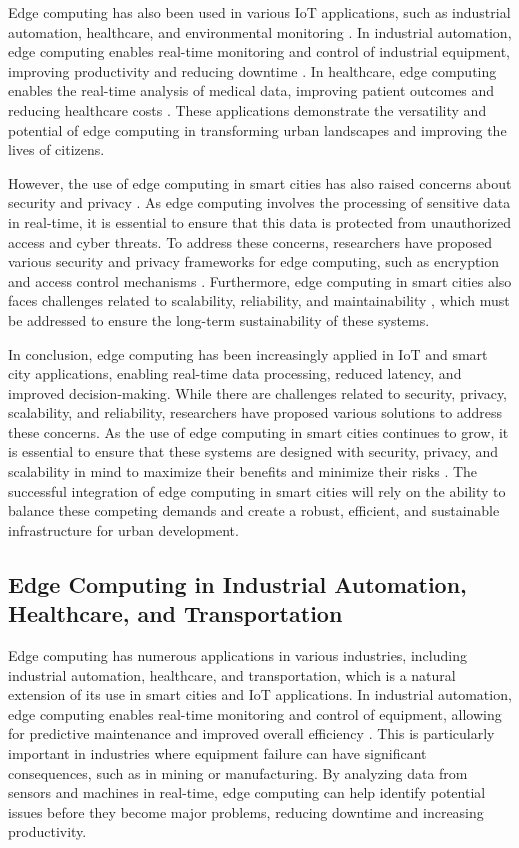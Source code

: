 \documentclass[11pt]{article}
\begin{document}
Edge computing has also been used in various IoT applications, such as industrial automation, healthcare, and environmental monitoring \cite{ref33}. In industrial automation, edge computing enables real-time monitoring and control of industrial equipment, improving productivity and reducing downtime \cite{ref34}. In healthcare, edge computing enables the real-time analysis of medical data, improving patient outcomes and reducing healthcare costs \cite{ref35}. These applications demonstrate the versatility and potential of edge computing in transforming urban landscapes and improving the lives of citizens.

However, the use of edge computing in smart cities has also raised concerns about security and privacy \cite{ref30}. As edge computing involves the processing of sensitive data in real-time, it is essential to ensure that this data is protected from unauthorized access and cyber threats. To address these concerns, researchers have proposed various security and privacy frameworks for edge computing, such as encryption and access control mechanisms \cite{ref36}. Furthermore, edge computing in smart cities also faces challenges related to scalability, reliability, and maintainability \cite{ref37}, which must be addressed to ensure the long-term sustainability of these systems.

In conclusion, edge computing has been increasingly applied in IoT and smart city applications, enabling real-time data processing, reduced latency, and improved decision-making. While there are challenges related to security, privacy, scalability, and reliability, researchers have proposed various solutions to address these concerns. As the use of edge computing in smart cities continues to grow, it is essential to ensure that these systems are designed with security, privacy, and scalability in mind to maximize their benefits and minimize their risks \cite{ref20}. The successful integration of edge computing in smart cities will rely on the ability to balance these competing demands and create a robust, efficient, and sustainable infrastructure for urban development.

\subsection{Edge Computing in Industrial Automation, Healthcare, and Transportation}

Edge computing has numerous applications in various industries, including industrial automation, healthcare, and transportation, which is a natural extension of its use in smart cities and IoT applications. In industrial automation, edge computing enables real-time monitoring and control of equipment, allowing for predictive maintenance and improved overall efficiency \cite{ref38}. This is particularly important in industries where equipment failure can have significant consequences, such as in mining or manufacturing. By analyzing data from sensors and machines in real-time, edge computing can help identify potential issues before they become major problems, reducing downtime and increasing productivity.
\end{document}
